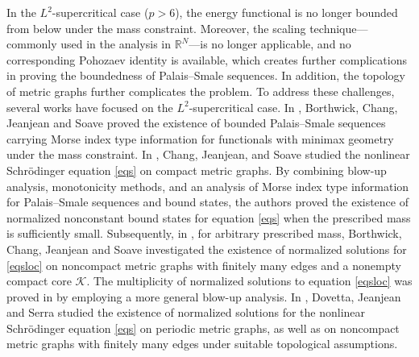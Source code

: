 \documentclass[11pt]{amsart}
\newcommand{\K}{\mathcal{K}}
\numberwithin{equation}{section}
\begin{document}
In the $L^2$-supercritical case ($p>6$), the energy functional is no longer bounded from below under the mass constraint. Moreover, the scaling technique---commonly used in the analysis in $\mathbb{R}^N$---is no longer applicable, and no corresponding Pohozaev identity is available, which creates further complications in proving the boundedness of Palais--Smale sequences. In addition, the topology of metric graphs further complicates the problem. To address these challenges, several works have focused on the $L^2$-supercritical case. In \cite{Bort0}, Borthwick, Chang, Jeanjean and Soave proved the existence of bounded Palais--Smale sequences carrying Morse index type information for functionals with minimax geometry under the mass constraint. In \cite{Cha}, Chang, Jeanjean, and Soave studied the nonlinear Schr\"{o}dinger equation \eqref{eqs} on compact metric graphs. By combining blow-up analysis, monotonicity methods, and an analysis of Morse index type information for Palais--Smale sequences and bound states, the authors proved the existence of normalized nonconstant bound states for equation \eqref{eqs} when the prescribed mass is sufficiently small. Subsequently, in \cite{Bort}, for arbitrary prescribed mass, Borthwick, Chang, Jeanjean and Soave investigated the existence of normalized solutions for \eqref{eqsloc} on noncompact metric graphs with finitely many edges and a nonempty compact core $\K$. The multiplicity of normalized solutions to equation \eqref{eqsloc} was proved in \cite{Ca} by employing a more general blow-up analysis. In \cite{Do0}, Dovetta, Jeanjean and Serra studied the existence of normalized solutions for the nonlinear Schr\"{o}dinger equation \eqref{eqs} on periodic metric graphs, as well as on noncompact metric graphs with finitely many edges under suitable topological assumptions.
\end{document}
